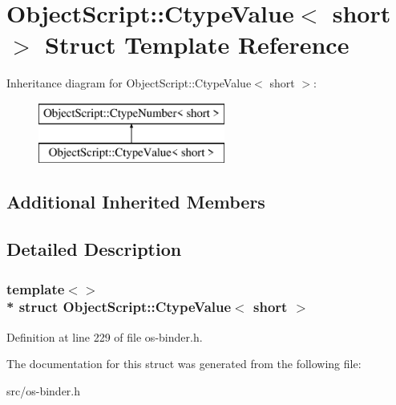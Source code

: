 \hypertarget{struct_object_script_1_1_ctype_value_3_01short_01_4}{}\section{Object\+Script\+:\+:Ctype\+Value$<$ short $>$ Struct Template Reference}
\label{struct_object_script_1_1_ctype_value_3_01short_01_4}
Inheritance diagram for Object\+Script\+:\+:Ctype\+Value$<$ short $>$\+:\begin{figure}[H]
\begin{center}
\leavevmode
\includegraphics[height=2.000000cm]{struct_object_script_1_1_ctype_value_3_01short_01_4}
\end{center}
\end{figure}
\subsection*{Additional Inherited Members}


\subsection{Detailed Description}
\subsubsection*{template$<$$>$\\*
struct Object\+Script\+::\+Ctype\+Value$<$ short $>$}



Definition at line 229 of file os-\/binder.\+h.



The documentation for this struct was generated from the following file\+:\begin{DoxyCompactItemize}
\item 
src/os-\/binder.\+h\end{DoxyCompactItemize}
